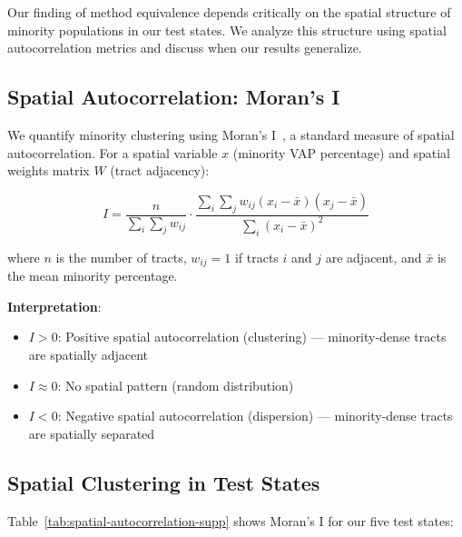 
Our finding of method equivalence depends critically on the spatial structure of minority populations in our test states. We analyze this structure using spatial autocorrelation metrics and discuss when our results generalize.

\subsection{Spatial Autocorrelation: Moran's I}

We quantify minority clustering using Moran's I~\cite{moran1950notes}, a standard measure of spatial autocorrelation. For a spatial variable $x$ (minority VAP percentage) and spatial weights matrix $W$ (tract adjacency):

\[
I = \frac{n}{\sum_i \sum_j w_{ij}} \cdot \frac{\sum_i \sum_j w_{ij}(x_i - \bar{x})(x_j - \bar{x})}{\sum_i (x_i - \bar{x})^2}
\]

where $n$ is the number of tracts, $w_{ij} = 1$ if tracts $i$ and $j$ are adjacent, and $\bar{x}$ is the mean minority percentage.

\textbf{Interpretation}:
\begin{itemize}
    \item $I > 0$: Positive spatial autocorrelation (clustering) --- minority-dense tracts are spatially adjacent
    \item $I \approx 0$: No spatial pattern (random distribution)
    \item $I < 0$: Negative spatial autocorrelation (dispersion) --- minority-dense tracts are spatially separated
\end{itemize}

\subsection{Spatial Clustering in Test States}

Table~\ref{tab:spatial-autocorrelation-supp} shows Moran's I for our five test states:

